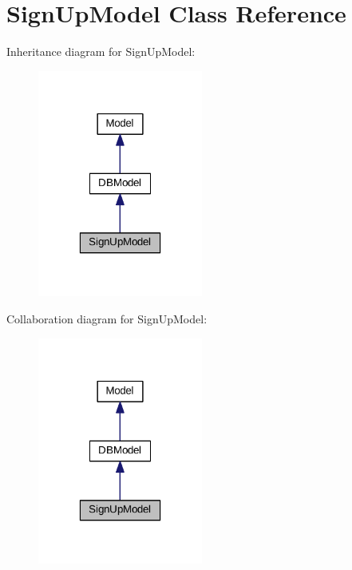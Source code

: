 \hypertarget{classSignUpModel}{\section{Sign\+Up\+Model Class Reference}
\label{classSignUpModel}
}


Inheritance diagram for Sign\+Up\+Model\+:\nopagebreak
\begin{figure}[H]
\begin{center}
\leavevmode
\includegraphics[width=154pt]{classSignUpModel__inherit__graph}
\end{center}
\end{figure}


Collaboration diagram for Sign\+Up\+Model\+:\nopagebreak
\begin{figure}[H]
\begin{center}
\leavevmode
\includegraphics[width=154pt]{classSignUpModel__coll__graph}
\end{center}
\end{figure}
